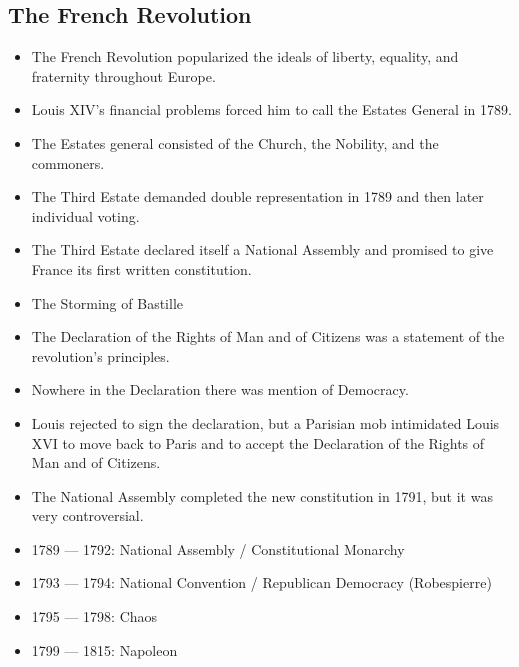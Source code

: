 \documentclass{article}
\begin{document}
\begin{spacing}{1.2}
    \section{The French Revolution}
    \begin{itemize}
        \item The French Revolution popularized the ideals of liberty, equality,
            and fraternity throughout Europe.
        \item Louis XIV's financial problems forced him to call the Estates
            General in 1789.
        \item The Estates general consisted of the Church, the Nobility, and the
            commoners.
        \item The Third Estate demanded double representation in 1789 and then
            later individual voting.
        \item The Third Estate declared itself a National Assembly and promised
            to give France its first written constitution.
        \item The Storming of Bastille
        \item The Declaration of the Rights of Man and of Citizens was a statement of the
            revolution's principles.
        \item Nowhere in the Declaration there was mention of Democracy.
        \item Louis rejected to sign the declaration, but a Parisian mob
            intimidated Louis XVI to move back to Paris and to accept the
            Declaration of the Rights of Man and of Citizens.
        \item The National Assembly completed the new constitution in 1791, but
            it was very controversial.
        \item 1789 --- 1792: National Assembly / Constitutional Monarchy
        \item 1793 --- 1794: National Convention / Republican
            Democracy (Robespierre)
        \item 1795 --- 1798: Chaos
        \item 1799 --- 1815: Napoleon
    \end{itemize}

\end{spacing}
\end{document}
